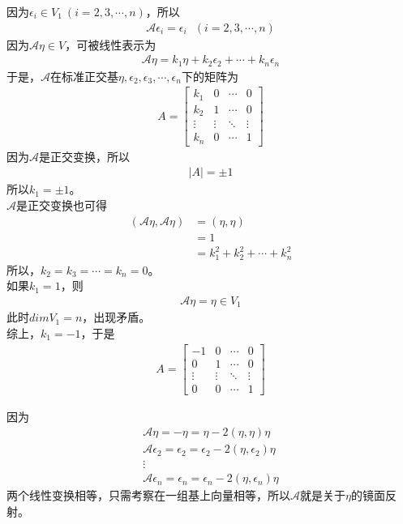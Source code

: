 \documentclass{article}
\begin{document}
因为$\epsilon_i \in V_{1} \ (i = 2, 3, \cdots, n)$，所以
\begin{align*}
  \mathscr{A} \epsilon_i = \epsilon_i \ \ \ (i = 2, 3, \cdots, n)
\end{align*}
因为$\mathscr{A}\eta \in V$，可被线性表示为
\begin{align*}
  \mathscr{A}\eta = k_1 \eta + k_2 \epsilon_2 + \cdots + k_n \epsilon_n
\end{align*}
于是，$\mathscr{A}$在标准正交基$\eta, \epsilon_2, \epsilon_3, \cdots, \epsilon_n$下的矩阵为
\begin{align*}
  A = \begin{bmatrix}
        k_1    & 0      & \cdots & 0      \\
        k_2    & 1      & \cdots & 0      \\
        \vdots & \vdots & \ddots & \vdots \\
        k_n    & 0      & \cdots & 1
      \end{bmatrix}
\end{align*}
因为$\mathscr{A}$是正交变换，所以
\begin{align*}
  |A| = \pm 1
\end{align*}
所以$k_1 = \pm 1$。\\
$\mathscr{A}$是正交变换也可得
\begin{align*}
  (\mathscr{A} \eta, \mathscr{A}\eta)
   & = (\eta, \eta)                   \\
   & = 1                              \\
   & = k_1^2 + k_2^2 + \cdots + k_n^2
\end{align*}
所以，$k_2 = k_3 = \cdots = k_n = 0$。\\
如果$k_1 = 1$，则
\begin{align*}
  \mathscr{A} \eta = \eta \in V_1
\end{align*}
此时$dim V_1 = n$，出现矛盾。\\
综上，$k_1 = -1$，于是
\begin{align*}
  A = \begin{bmatrix}
        -1     & 0      & \cdots & 0      \\
        0      & 1      & \cdots & 0      \\
        \vdots & \vdots & \ddots & \vdots \\
        0      & 0      & \cdots & 1
      \end{bmatrix}
\end{align*}

因为
\begin{align*}
  \mathscr{A}\eta = -\eta = \eta - 2(\eta,\eta) \eta                        \\
  \mathscr{A}\epsilon_2 = \epsilon_2 = \epsilon_2 - 2(\eta,\epsilon_2) \eta \\
  \vdots                                                                    \\
  \mathscr{A}\epsilon_n = \epsilon_n = \epsilon_n - 2(\eta,\epsilon_n) \eta
\end{align*}
两个线性变换相等，只需考察在一组基上向量相等，所以$\mathscr{A}$就是关于$\eta$的镜面反射。
\end{document}

